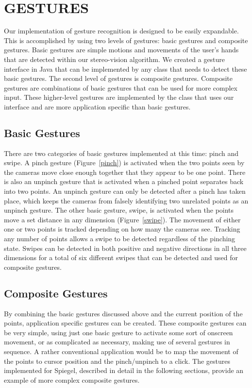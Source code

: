 \documentclass[a4paper,twoside]{article}
\begin{document}
\section{\uppercase{Gestures}} Our implementation of gesture recognition is
designed to be easily expandable. This is accomplished by using two levels of
gestures: basic gestures and composite gestures. Basic gestures are simple
motions and movements of the user's hands that are detected within our
stereo-vision algorithm. We created a gesture interface in Java that can be
implemented by any class that needs to detect these basic gestures. The second
level of gestures is composite gestures. Composite gestures are combinations of
basic gestures that can be used for more complex input. These higher-level
gestures are implemented by the class that uses our interface and are more
application specific than basic gestures.  \subsection{Basic Gestures} There
are two categories of basic gestures implemented at this time: pinch and swipe.
A pinch gesture (Figure~\ref{pinch}) is activated when the two points seen by
the cameras move close enough together that they appear to be one point. There
is also an unpinch gesture that is activated when a pinched point separates
back into two points. An unpinch gesture can only be detected after a pinch has
taken place, which keeps the cameras from falsely identifying two unrelated
points as an unpinch gesture. The other basic gesture, swipe, is activated when
the points move a set distance in any dimension (Figure~\ref{swipe}). The
movement of either one or two points is tracked depending on how many the
cameras see. Tracking any number of points allows a swipe to be detected
regardless of the pinching state. Swipes can be detected in both positive and
negative directions in all three dimensions for a total of six different swipes
that can be detected and used for composite gestures.

\subsection{Composite Gestures} By combining the basic gestures discussed above
and the current position of the points, application specific gestures can be
created. These composite gestures can be very simple, using just one basic
gesture to activate some sort of onscreen movement, or as complicated as
necessary, making use of several gestures in sequence. A rather conventional
application would be to map the movement of the points to cursor position and
the pinch/unpinch to a click.  The gestures implemented for Spiegel, described
in detail in the following sections, provide an example of more complex
composite gestures. 
\end{document}
